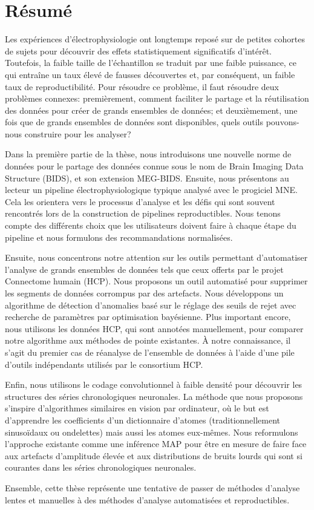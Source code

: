 \chapter*{Résumé}

Les expériences d'électrophysiologie ont longtemps reposé sur de petites cohortes de sujets pour découvrir des effets statistiquement significatifs d'intérêt. Toutefois, la faible taille de l'échantillon se traduit par une faible puissance, ce qui entraîne un taux élevé de fausses découvertes et, par conséquent, un faible taux de reproductibilité. Pour résoudre ce problème, il faut résoudre deux problèmes connexes: premièrement, comment faciliter le partage et la réutilisation des données pour créer de grands ensembles de données; et deuxièmement, une fois que de grands ensembles de données sont disponibles, quels outils pouvons-nous construire pour les analyser?

Dans la première partie de la thèse, nous introduisons une nouvelle norme de données pour le partage des données connue sous le nom de Brain Imaging Data Structure (BIDS), et son extension MEG-BIDS. Ensuite, nous présentons au lecteur un pipeline électrophysiologique typique analysé avec le progiciel MNE. Cela les orientera vers le processus d'analyse et les défis qui sont souvent rencontrés lors de la construction de pipelines reproductibles. Nous tenons compte des différents choix que les utilisateurs doivent faire à chaque étape du pipeline et nous formulons des recommandations normalisées.

Ensuite, nous concentrons notre attention sur les outils permettant d'automatiser l'analyse de grands ensembles de données tels que ceux offerts par le projet Connectome humain (HCP). Nous proposons un outil automatisé pour supprimer les segments de données corrompus par des artefacts. Nous développons un algorithme de détection d'anomalies basé sur le réglage des seuils de rejet avec recherche de paramètres par optimisation bayésienne. Plus important encore, nous utilisons les données HCP, qui sont annotées manuellement, pour comparer notre algorithme aux méthodes de pointe existantes. À notre connaissance, il s'agit du premier cas de réanalyse de l'ensemble de données à l'aide d'une pile d'outils indépendants utilisés par le consortium HCP.

Enfin, nous utilisons le codage convolutionnel à faible densité pour découvrir les structures des séries chronologiques neuronales. La méthode que nous proposons s'inspire d'algorithmes similaires en vision par ordinateur, où le but est d'apprendre les coefficients d'un dictionnaire d'atomes (traditionnellement sinusoïdaux ou ondelettes) mais aussi les atomes eux-mêmes. Nous reformulons l'approche existante comme une inférence MAP pour être en mesure de faire face aux artefacts d'amplitude élevée et aux distributions de bruits lourds qui sont si courantes dans les séries chronologiques neuronales. 

Ensemble, cette thèse représente une tentative de passer de méthodes d'analyse lentes et manuelles à des méthodes d'analyse automatisées et reproductibles.

